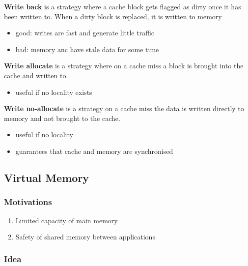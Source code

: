 \documentclass{article}
\begin{document}
\begin{definition}
	\textbf{Write back} is a strategy where a cache block gets flagged as
	dirty once it has been written to. When a dirty block is replaced,
	it is written to memory
	\begin{itemize}
		\item good: writes are fast and generate little traffic
		\item bad: memory anc have stale data for some time
	\end{itemize}
\end{definition}

\begin{definition}
	\textbf{Write allocate} is a strategy where on a cache miss a block 
	is brought into the cache and written to.
	\begin{itemize}
		\item useful if no locality exists
	\end{itemize}
\end{definition}

\begin{definition}
	\textbf{Write no-allocate} is a strategy on a cache miss the data is
	written directly to memory and not brought to the cache.
	\begin{itemize}
		\item useful if no locality
		\item guarantees that cache and memory are synchronised
	\end{itemize}
\end{definition}


\subsection{Virtual Memory}


\subsubsection{Motivations}

\begin{enumerate}
	\item Limited capacity of main memory
	\item Safety of shared memory between applications
\end{enumerate}

\subsubsection{Idea}
\end{document}

